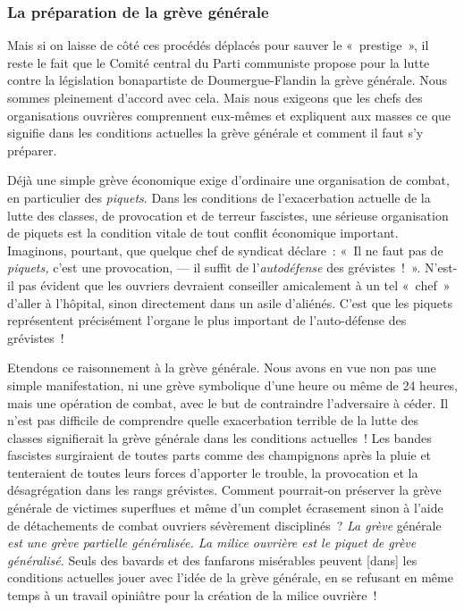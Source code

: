 \documentclass[french,twoside]{book} %
\newcommand\corr[1]{#1}
\begin{document}
\subsubsection[{La préparation de la grève générale}]{La préparation de la grève générale}
\noindent Mais si on laisse de côté ces procédés déplacés pour sauver le « prestige », il reste le fait que le Comité central  du Parti communiste propose pour la lutte contre la législation bonapartiste de Doumergue-Flandin la grève générale. Nous sommes pleinement d’accord avec cela. Mais nous exigeons que les chefs des organisations ouvrières comprennent eux-mêmes et expliquent aux masses ce que signifie dans les conditions actuelles la grève générale et comment il faut s’y préparer.\par
Déjà une simple grève économique exige d’ordinaire une organisation de combat, en particulier des \emph{piquets}. Dans les conditions de l’exacerbation actuelle de la lutte des classes, de provocation et de terreur fascistes, une sérieuse organisation de piquets est la condition vitale de tout conflit économique important. Imaginons, pourtant, que quelque chef de syndicat déclare : « Il ne faut pas de \emph{piquets,} c’est une provocation, — il suffit de l’\emph{autodéfense} des grévistes ! ». N’est-il pas évident que les ouvriers devraient conseiller amicalement à un tel « chef » d’aller à l’hôpital, sinon directement dans un asile d’aliénés. C’est que les piquets représentent précisément l’organe le plus important de l’auto-défense des grévistes !\par
Etendons ce raisonnement à la grève générale. Nous avons en vue non pas une simple manifestation, ni une grève symbolique d’une heure ou même de 24 heures, mais une opération de combat, avec le but de contraindre l’adversaire à céder. Il n’est pas difficile de comprendre quelle exacerbation terrible de la lutte des classes signifierait la grève générale dans les conditions actuelles ! Les bandes fascistes surgiraient de toutes parts comme des champignons après la pluie et tenteraient de toutes leurs forces d’apporter le trouble, la provocation et la désagrégation dans les rangs grévistes. Comment pourrait-on préserver la grève générale de victimes superflues et même d’un complet écrasement sinon à l’aide de détachements de combat ouvriers sévèrement disciplinés ? \emph{La grève} générale \emph{est une grève partielle généralisée. La milice ouvrière  est le piquet de grève généralisé.} Seuls des bavards et des fanfarons misérables peuvent [{\corr dans}] les conditions actuelles jouer avec l’idée de la grève générale, en se refusant en même temps à un travail opiniâtre pour la création de la milice ouvrière !
\end{document}
